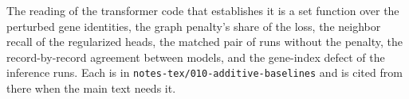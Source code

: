 The reading of the transformer code that establishes it is a set function over the
perturbed gene identities, the graph penalty's share of the loss, the neighbor recall
of the regularized heads, the matched pair of runs without the penalty, the
record-by-record agreement between models, and the gene-index defect of the
inference runs. Each is in \texttt{notes-tex/010-additive-baselines} and is cited
from there when the main text needs it.
